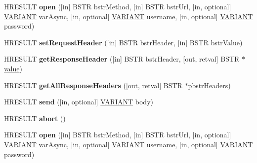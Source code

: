 \begin{DoxyCompactItemize}
H\+R\+E\+S\+U\+LT {\bfseries open} (\mbox{[}in\mbox{]} B\+S\+TR bstr\+Method, \mbox{[}in\mbox{]} B\+S\+TR bstr\+Url, \mbox{[}in, optional\mbox{]} \hyperlink{structtag_v_a_r_i_a_n_t}{V\+A\+R\+I\+A\+NT} var\+Async, \mbox{[}in, optional\mbox{]} \hyperlink{structtag_v_a_r_i_a_n_t}{V\+A\+R\+I\+A\+NT} username, \mbox{[}in, optional\mbox{]} \hyperlink{structtag_v_a_r_i_a_n_t}{V\+A\+R\+I\+A\+NT} password)
\item 
\mbox{\label{interface_m_s_x_m_l2_1_1_i_x_m_l_h_t_t_p_request_a00cbfdde8955835d077bdd8dd2d85c89}} 
H\+R\+E\+S\+U\+LT {\bfseries set\+Request\+Header} (\mbox{[}in\mbox{]} B\+S\+TR bstr\+Header, \mbox{[}in\mbox{]} B\+S\+TR bstr\+Value)
\item 
\mbox{\label{interface_m_s_x_m_l2_1_1_i_x_m_l_h_t_t_p_request_af6a3a39333faafb5c348bef6da52388d}} 
H\+R\+E\+S\+U\+LT {\bfseries get\+Response\+Header} (\mbox{[}in\mbox{]} B\+S\+TR bstr\+Header, \mbox{[}out, retval\mbox{]} B\+S\+TR $\ast$\hyperlink{unionvalue}{value})
\item 
\mbox{\label{interface_m_s_x_m_l2_1_1_i_x_m_l_h_t_t_p_request_ac7ef7f39ab302a2a492acba0a66f2b5b}} 
H\+R\+E\+S\+U\+LT {\bfseries get\+All\+Response\+Headers} (\mbox{[}out, retval\mbox{]} B\+S\+TR $\ast$pbstr\+Headers)
\item 
\mbox{\label{interface_m_s_x_m_l2_1_1_i_x_m_l_h_t_t_p_request_a334a1cc5f473bcba29051f2984024d84}} 
H\+R\+E\+S\+U\+LT {\bfseries send} (\mbox{[}in, optional\mbox{]} \hyperlink{structtag_v_a_r_i_a_n_t}{V\+A\+R\+I\+A\+NT} body)
\item 
\mbox{\label{interface_m_s_x_m_l2_1_1_i_x_m_l_h_t_t_p_request_a70823553510730e7fba9e02bc352d387}} 
H\+R\+E\+S\+U\+LT {\bfseries abort} ()
\item 
\mbox{\label{interface_m_s_x_m_l2_1_1_i_x_m_l_h_t_t_p_request_ae3bc84e9f3251a47c95dcd7326da5963}} 
H\+R\+E\+S\+U\+LT {\bfseries open} (\mbox{[}in\mbox{]} B\+S\+TR bstr\+Method, \mbox{[}in\mbox{]} B\+S\+TR bstr\+Url, \mbox{[}in, optional\mbox{]} \hyperlink{structtag_v_a_r_i_a_n_t}{V\+A\+R\+I\+A\+NT} var\+Async, \mbox{[}in, optional\mbox{]} \hyperlink{structtag_v_a_r_i_a_n_t}{V\+A\+R\+I\+A\+NT} username, \mbox{[}in, optional\mbox{]} \hyperlink{structtag_v_a_r_i_a_n_t}{V\+A\+R\+I\+A\+NT} password)

\end{DoxyCompactItemize}
